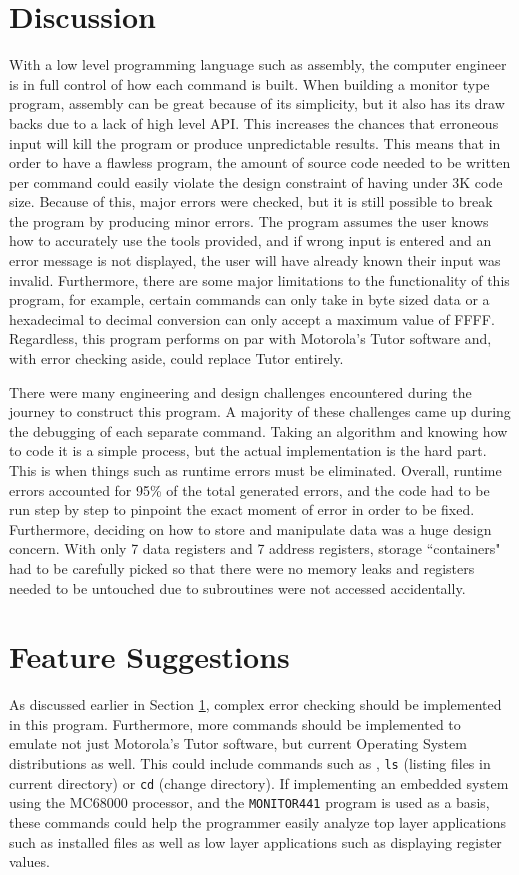 \documentclass[12pt]{article}
\begin{document}
			\section{Discussion}\label{sec:discussion}
			With a low level programming language such as assembly, the computer engineer is in full control of how each command is built. When building a monitor type program, assembly can be great because of its simplicity, but it also has its draw backs due to a lack of high level API. This increases the chances that erroneous input will kill the program or produce unpredictable results. This means that in order to have a flawless program, the amount of source code needed to be written per command could easily violate the design constraint of having under 3K code size. Because of this, major errors were checked, but it is still possible to break the program by producing minor errors. The program assumes the user knows how to accurately use the tools provided, and if wrong input is entered and an error message is not displayed, the user will have already known their input was invalid. Furthermore, there are some major limitations to the functionality of this program, for example, certain commands can only take in byte sized data or a hexadecimal to decimal conversion can only accept a maximum value of FFFF. Regardless, this program performs on par with Motorola's Tutor software and, with error checking aside, could replace Tutor entirely. 
			
			There were many engineering and design challenges encountered during the journey to construct this program. A majority of these challenges came up during the debugging of each separate command. Taking an algorithm and knowing how to code it is a simple process, but the actual implementation is the hard part. This is when things such as runtime errors must be eliminated. Overall, runtime errors accounted for 95\% of the total generated errors, and the code had to be run step by step to pinpoint the exact moment of error in order to be fixed. Furthermore, deciding on how to store and manipulate data was a huge design concern. With only 7 data registers and 7 address registers, storage ``containers" had to be carefully picked so that there were no memory leaks and registers needed to be untouched due to subroutines were not accessed accidentally.
			\section{Feature Suggestions}
			As discussed earlier in Section \ref{sec:discussion}, complex error checking should be implemented in this program. Furthermore, more commands should be implemented to emulate not just Motorola's Tutor software, but current Operating System distributions as well. This could include commands such as , \texttt{ls} (listing files in current directory) or \texttt{cd} (change directory). If implementing an embedded system using the MC68000 processor, and the \texttt{MONITOR441} program is used as a basis, these commands could help the programmer easily analyze top layer applications such as installed files as well as low layer applications such as displaying register values.
\end{document}
